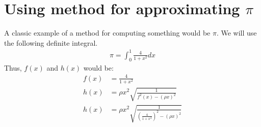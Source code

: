 \documentclass[letterpaper, 12pt]{article}
\begin{document}
\section{Using method for approximating $\pi$}
A classic example of a method for computing something would be $\pi$.
We will use the following definite integral.
\begin{align*}
	\pi = \int_0^1 \frac{4}{1 + x^2}dx
\end{align*}
Thus, $f(x)$ and $h(x)$ would be:
\begin{align*}
	f(x) &= \frac{4}{1 + x^2}\\
	h(x) &= \rho x^2\sqrt{\frac{1}{f^2(x) - (\rho x)^2}}\\
	h(x) &= \rho x^2\sqrt{\frac{1}{(\frac{4}{1 + x^2})^2 - (\rho x)^2}}\\
\end{align*}
\end{document}

